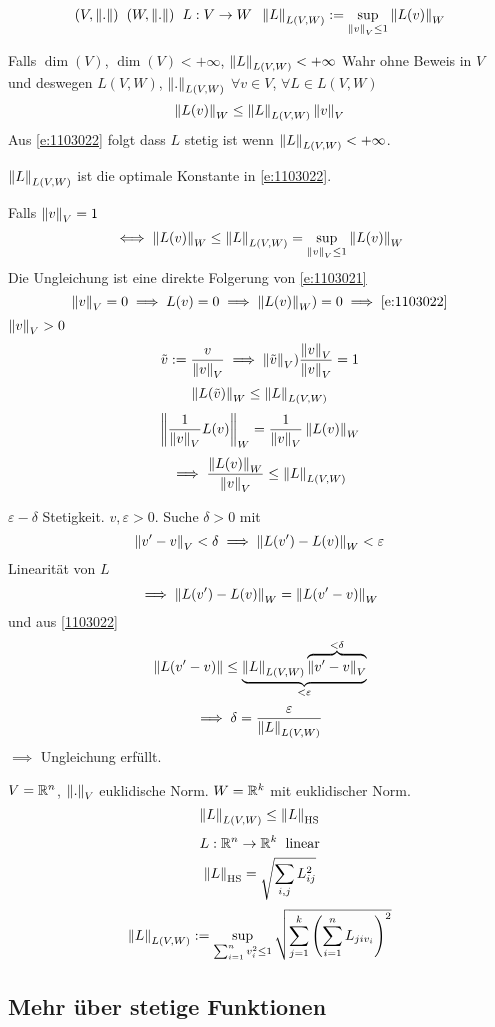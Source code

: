 \begin{equation}
  \label{e:1103021}
  (V,\left\| . \right\|)\hspace{2mm} (W,\left\| . \right\|)\hspace{2mm} L:V\to W\hspace{2mm}\left\| L \right\|_{L(V,W)}:=\sup_{\left\| v \right\|_V\leq 1}\left\| L(v) \right\|_W
\end{equation}
\begin{Sat}
  Falls $\dim(V)$, $\dim(V)< +\infty$, $\left\| L \right\|_{L(V,W)}< + \infty$ Wahr ohne Beweis in $V$ und deswegen $L(V,W)$, $\left\| . \right\|_{L(V,W)}$ $\forall v\in V$, $\forall L\in L(V,W)$
  \begin{equation}
    \label{e:1103022}
    \left\| L(v) \right\|_W\leq\left\| L \right\|_{L(V,W)}\left\| v \right\|_V
  \end{equation}
  Aus \ref{e:1103022} folgt dass $L$ stetig ist wenn $\left\| L \right\|_{L(V,W)}< +\infty$.
\end{Sat}
\begin{Bem}
  $\left\| L \right\|_{L(V,W)}$ ist die optimale Konstante in \ref{e:1103022}.
\end{Bem}
\begin{Bew}
  Falls $\left\| v \right\|_V=1$
  \[\iff \left\| L(v) \right\|_W\leq \left\| L \right\|_{L(V,W)}=\sup_{\left\| v \right\|_V\leq 1}\left\| L(v) \right\|_W\]
  Die Ungleichung ist eine direkte Folgerung von \ref{e:1103021}
  \[\left\| v \right\|_V=0\implies L(v)=0\implies\left\| L(v) \right\|_W)=0\implies\ref{e:1103022}\]
  $\left\| v \right\|_V>0$
  \[\tilde v:=\frac{v}{\left\| v \right\|_V}\implies\left\| \tilde v \right\|_V)\frac{\left\| v \right\|_V}{\left\| v \right\|_V}=1\]
  \[\left\| L(\tilde v) \right\|_W\leq \left\| L \right\|_{L(V,W)}\]
  \[\left\| \frac{1}{\left\| v \right\|_V}L(v) \right\|_W=\frac{1}{\left\| v \right\|_V}\left\| L(v) \right\|_W\]
  \[\implies\frac{\left\| L(v) \right\|_W}{\left\| v \right\|_V}\leq \left\| L \right\|_{L(V,W)}\]
\end{Bew}
\begin{Bew}
  $\varepsilon-\delta$ Stetigkeit. $v,\varepsilon>0$. Suche $\delta>0$ mit
  \[\left\| v'-v \right\|_V<\delta\implies\left\| L(v')-L(v) \right\|_W<\varepsilon\]
  Linearität von $L$
  \[\implies \left\| L(v')-L(v) \right\|_W=\left\| L(v'-v) \right\|_W\]
  und aus \ref{1103022}
  \[\left\| L(v'-v) \right\|\leq\underbrace{\left\| L \right\|_{L(V,W)}\overbrace{\left\| v'-v \right\|_V}^{<\delta}}_{<\varepsilon}\]
  \[\implies \delta=\frac{\varepsilon}{\left\| L \right\|_{L(V,W)}}\]
  $\implies$ Ungleichung erfüllt.
\end{Bew}
\begin{Bem}
  $V=\mathbb{R}^n$, $\left\| . \right\|_V$ euklidische Norm. $W=\mathbb{R}^k$ mit euklidischer Norm.
  \[\left\| L \right\|_{L(V,W)}\leq \left\| L \right\|_{\text{HS}}\]
  \[L:\mathbb{R}^n\to\mathbb{R}^k\hspace{2mm}\text{linear}\]
  \[\left\| L \right\|_\text{HS}=\sqrt{\sum_{i,j}L_{ij}^2}\]
  \[\left\| L \right\|_{L(V,W)}:=\sup_{\sum^n_{i=1}v_i^2\leq 1}\sqrt{\sum^k_{j=1}\left( \sum_{i=1}^nL_{jiv_i} \right)^2}\]
\end{Bem}
\subsection{Mehr über stetige Funktionen}
